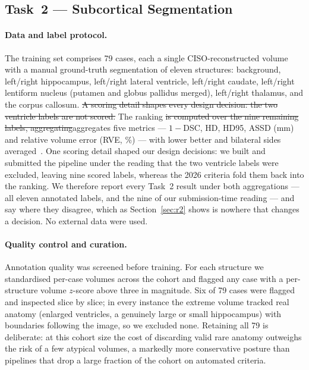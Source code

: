 \documentclass[runningheads]{llncs}
\newcommand{\addone}[1]{\textcolor{revone}{#1}}
\newcommand{\delone}[1]{\textcolor{revone}{\sout{#1}}}
\begin{document}
\subsection{Task~2 --- Subcortical Segmentation}
\label{sec:m2}

\paragraph{Data and label protocol.}
The training set comprises 79 cases, each a single CISO-reconstructed volume with
a manual ground-truth segmentation of eleven structures: background, left/right
hippocampus, left/right lateral ventricle, left/right caudate, left/right
lentiform nucleus (putamen and globus pallidus merged), left/right thalamus, and
the corpus callosum. \delone{A scoring detail shapes every design decision: the two
ventricle labels are not scored.} The ranking \delone{is computed over the nine
remaining labels, aggregating}\addone{aggregates} five metrics --- $1-$DSC, HD, HD95,
ASSD (mm) and relative volume error (RVE, \%) --- with lower better and bilateral
sides averaged~\cite{maierhein2024metrics}. \addone{One scoring detail shaped our
design decisions: we built and submitted the pipeline under the reading that the two
ventricle labels were excluded, leaving nine scored labels, whereas the 2026 criteria
fold them back into the ranking. We therefore report every Task~2 result under both
aggregations --- all eleven annotated labels, and the nine of our submission-time
reading --- and say where they disagree, which as Section~\ref{sec:r2} shows is
nowhere that changes a decision.} No external data were used.

\paragraph{Quality control and curation.}
Annotation quality was screened before training. For each structure we
standardised per-case volumes across the cohort and flagged any case with a
per-structure volume $z$-score above three in magnitude. Six of 79 cases were
flagged and inspected slice by slice; in every instance the extreme volume
tracked real anatomy (enlarged ventricles, a genuinely large or small
hippocampus) with boundaries following the image, so we excluded none. Retaining
all 79 is deliberate: at this cohort size the cost of discarding valid rare
anatomy outweighs the risk of a few atypical volumes, a markedly more
conservative posture than pipelines that drop a large fraction of the cohort on
automated criteria.
\end{document}
